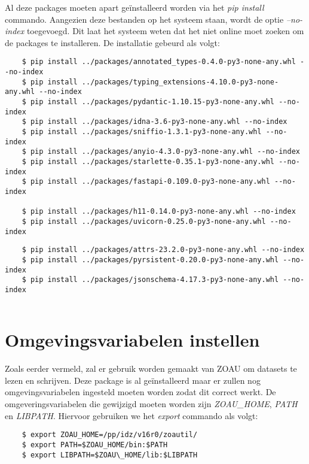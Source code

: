 Al deze packages moeten apart geïnstalleerd worden via het \textit{pip install} commando. Aangezien deze bestanden op het systeem staan, wordt de optie \textit{--no-index} toegevoegd. Dit laat het systeem weten dat het niet online moet zoeken om de packages te installeren. De installatie gebeurd als volgt:\\
\begin{lstlisting}
    $ pip install ../packages/annotated_types-0.4.0-py3-none-any.whl --no-index
    $ pip install ../packages/typing_extensions-4.10.0-py3-none-any.whl --no-index
    $ pip install ../packages/pydantic-1.10.15-py3-none-any.whl --no-index
    $ pip install ../packages/idna-3.6-py3-none-any.whl --no-index
    $ pip install ../packages/sniffio-1.3.1-py3-none-any.whl --no-index
    $ pip install ../packages/anyio-4.3.0-py3-none-any.whl --no-index
    $ pip install ../packages/starlette-0.35.1-py3-none-any.whl --no-index
    $ pip install ../packages/fastapi-0.109.0-py3-none-any.whl --no-index
    
    $ pip install ../packages/h11-0.14.0-py3-none-any.whl --no-index
    $ pip install ../packages/uvicorn-0.25.0-py3-none-any.whl --no-index
\end{lstlisting}

\begin{lstlisting}
    $ pip install ../packages/attrs-23.2.0-py3-none-any.whl --no-index
    $ pip install ../packages/pyrsistent-0.20.0-py3-none-any.whl --no-index
    $ pip install ../packages/jsonschema-4.17.3-py3-none-any.whl --no-index
    
\end{lstlisting}

\section{Omgevingsvariabelen instellen}
Zoals eerder vermeld, zal er gebruik worden gemaakt van ZOAU om datasets te lezen en schrijven. Deze package is al geïnstalleerd maar er zullen nog omgevingsvariabelen ingesteld moeten worden zodat dit correct werkt. De omgeveringsvariabelen die gewijzigd moeten worden zijn \textit{ZOAU\_HOME}, \textit{PATH} en \textit{LIBPATH}. Hiervoor gebruiken we het \textit{export} commando als volgt: \\

\begin{lstlisting}
    $ export ZOAU_HOME=/pp/idz/v16r0/zoautil/
    $ export PATH=$ZOAU_HOME/bin:$PATH
    $ export LIBPATH=$ZOAU\_HOME/lib:$LIBPATH
    
\end{lstlisting}


